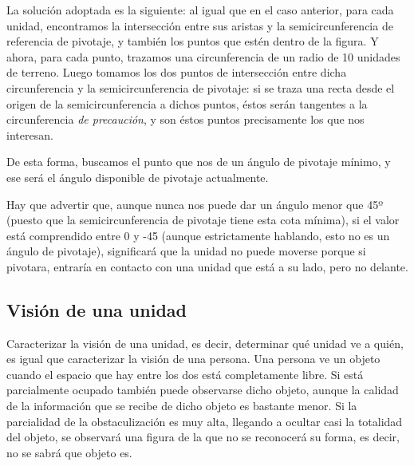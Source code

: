 \begin{minipage}[h]{0.5\columnwidth}
\end{minipage}
\begin{minipage}[h]{0.5\columnwidth}
La solución adoptada es la siguiente: al igual que en el caso
anterior, para cada unidad, encontramos la intersección entre sus
aristas y la semicircunferencia de referencia de pivotaje, y también
los puntos que estén dentro de la figura. Y ahora, para cada punto,
trazamos una circunferencia de un radio de 10 unidades de
terreno. Luego tomamos los dos puntos de intersección entre dicha
circunferencia y la semicircunferencia de pivotaje: si se traza una
recta desde el origen de la semicircunferencia a dichos puntos, éstos
serán tangentes a la circunferencia \emph{de precaución}, y son éstos
puntos precisamente los que nos interesan.
\end{minipage}

De esta forma, buscamos el punto que nos de un ángulo de pivotaje
mínimo, y ese será el ángulo disponible de pivotaje actualmente.

Hay que advertir que, aunque nunca nos puede dar un ángulo
menor que 45º (puesto que la semicircunferencia de pivotaje tiene esta
cota mínima), si el valor está comprendido entre 0 y -45 (aunque
estrictamente hablando, esto no es un ángulo de pivotaje), significará
que la unidad no puede moverse porque si pivotara, entraría en
contacto con una unidad que está a su lado, pero no delante.

\subsection{Visión de una unidad}
Caracterizar la visión de una unidad, es decir, determinar qué unidad
ve a quién, es igual que caracterizar la
visión de una persona. Una persona ve un objeto cuando el espacio que
hay entre los dos está completamente libre. Si está parcialmente
ocupado también puede observarse dicho objeto, aunque la calidad de la
información que se recibe de dicho objeto es bastante menor. Si la parcialidad
de la obstaculización es muy alta, llegando a ocultar casi la
totalidad del objeto, se observará una figura de la que no
se reconocerá su forma, es decir, no se sabrá que objeto es.

